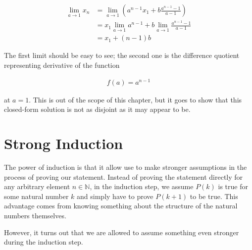 \documentclass[twoside]{report}
\begin{document}
\begin{align*}
	\lim_{a \rightarrow 1} x_n &= \lim_{a \rightarrow 1} \left( a^{n - 1} x_1 + b \frac{a^{n - 1} - 1}{a - 1} \right) \\
	&= x_1 \lim_{a \rightarrow 1} a^{n - 1} + b \lim_{a \rightarrow 1} \frac{a^{n - 1} - 1}{a - 1} \\
	&= x_1 + (n -1) b
\end{align*}

The first limit should be easy to see; the second one is the difference quotient representing derivative of the function

\begin{align*}
	f(a) = a^{n - 1}
\end{align*}

at $a = 1$. This is out of the scope of this chapter, but it goes to show that this closed-form solution is not as disjoint as it may appear to be.


\section{Strong Induction}


The power of induction is that it allow use to make stronger assumptions in the process of proving our statement. Instead of proving the statement directly for any arbitrary element $n \in \mathbb{N}$, in the induction step, we assume $P(k)$ is true for some natural number $k$ and simply have to prove $P(k + 1)$ to be true. This advantage comes from knowing something about the structure of the natural numbers themselves.

However, it turns out that we are allowed to assume something even stronger during the induction step.
\end{document}

